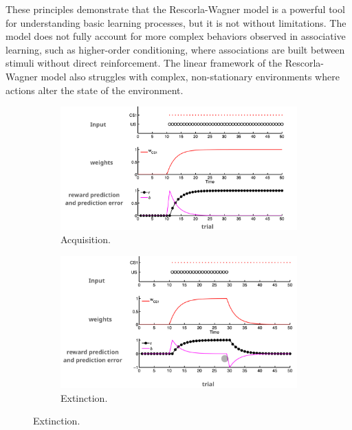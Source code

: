 \documentclass[11pt]{book} %
\begin{document}
These principles demonstrate that the Rescorla-Wagner model is a powerful tool for understanding basic learning processes, but it is not without limitations. 
The model does not fully account for more complex behaviors observed in associative learning, 
such as higher-order conditioning, where associations are built between stimuli without direct reinforcement. 
The linear framework of the Rescorla-Wagner model also struggles with complex, non-stationary environments where actions alter the state of the environment.

\begin{figure}[ht]
    \begin{subfigure}[b]{0.33\textwidth}
        \centering
        \includegraphics[width=\textwidth]{./Figs/acquisiton_exp.jpeg}
        \caption{Acquisition.}
        \label{fig:rescorla_wagner}
    \end{subfigure}
    \begin{subfigure}[b]{0.31\textwidth}
        \centering
        \includegraphics[width=\textwidth]{./Figs/extinction_exp.jpeg}
        \caption{Extinction.}
        \label{fig:overshadowing}
    \end{subfigure}

\end{figure}
\end{document}
